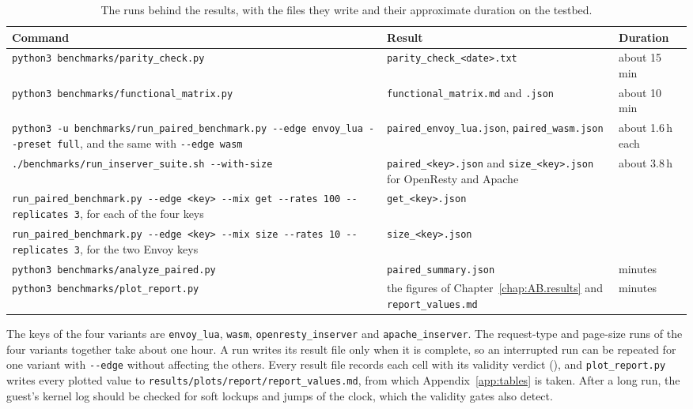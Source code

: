 \documentclass{rptuma}
\begin{document}
\begin{table}[!htbp]
\centering
\footnotesize
\begin{tabularx}{\textwidth}{@{}>{\raggedright\arraybackslash}p{6.6cm}>{\raggedright\arraybackslash}X>{\raggedright\arraybackslash}p{1.8cm}@{}}
\toprule
Command & Result & Duration \\
\midrule
\texttt{python3 benchmarks/parity\_check.py} & \texttt{parity\_check\_<date>.txt} & about 15\,min \\ \addlinespace
\texttt{python3 benchmarks/functional\_matrix.py} & \texttt{functional\_matrix.md} and \texttt{.json} & about 10\,min \\ \addlinespace
\texttt{python3 -u benchmarks/\allowbreak run\_paired\_benchmark.py -{}-edge envoy\_lua -{}-preset full}, and the same with \texttt{-{}-edge wasm} & \texttt{paired\_envoy\_lua.json}, \texttt{paired\_wasm.json} & about 1.6\,h each \\ \addlinespace
\texttt{./benchmarks/run\_inserver\_suite.sh -{}-with-size} & \texttt{paired\_<key>.json} and \texttt{size\_<key>.json} for OpenResty and Apache & about 3.8\,h \\ \addlinespace
\texttt{run\_paired\_benchmark.py -{}-edge <key> -{}-mix get -{}-rates 100 -{}-replicates 3}, for each of the four keys & \texttt{get\_<key>.json} & \\ \addlinespace
\texttt{run\_paired\_benchmark.py -{}-edge <key> -{}-mix size -{}-rates 10 -{}-replicates 3}, for the two Envoy keys & \texttt{size\_<key>.json} & \\ \addlinespace
\texttt{python3 benchmarks/analyze\_paired.py} & \texttt{paired\_summary.json} & minutes \\ \addlinespace
\texttt{python3 benchmarks/plot\_report.py} & the figures of Chapter~\ref{chap:AB.results} and \texttt{report\_values.md} & minutes \\
\bottomrule
\end{tabularx}
\caption{The runs behind the results, with the files they write and their approximate duration on the testbed.}
\label{tab:app.repro}
\end{table}

The keys of the four variants are \texttt{envoy\_lua}, \texttt{wasm}, \texttt{openresty\_inserver}
and \texttt{apache\_inserver}. The request-type and page-size runs of the four variants together
take about one hour. A run writes its result file only when it is complete, so an interrupted run
can be repeated for one variant with \texttt{-{}-edge} without affecting the others. Every result file
records each cell with its validity verdict (), and
\texttt{plot\_report.py} writes every plotted value to \texttt{results/plots/report/report\_values.md},
from which Appendix~\ref{app:tables} is taken. After a long run, the guest's kernel log should be
checked for soft lockups and jumps of the clock, which the validity gates also detect.
\end{document}
